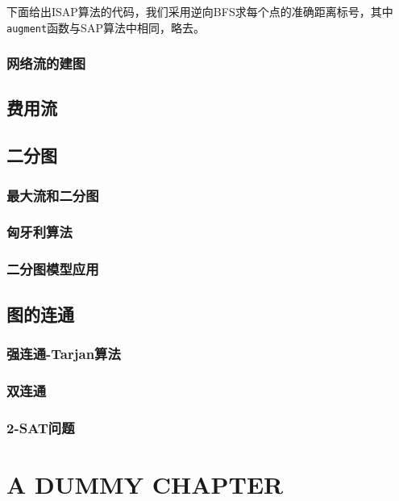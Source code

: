 \documentclass{ctexbook}
\begin{document}
  下面给出ISAP算法的代码，我们采用逆向BFS求每个点的准确距离标号，其中\texttt{augment}函数与SAP算法中相同，略去。
  
  \subsection{网络流的建图}
  \section{费用流}
  \section{二分图}
  \subsection{最大流和二分图}
  \subsection{匈牙利算法}
  \subsection{二分图模型应用}
  \section{图的连通}
  \subsection{强连通-Tarjan算法}
  \subsection{双连通}
  \subsection{2-SAT问题}
  \chapter{A DUMMY CHAPTER}
\end{document}

